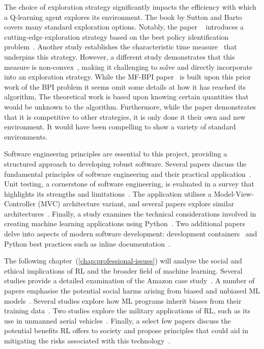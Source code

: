 \documentclass[]{final_report}
\begin{document}
The choice of exploration strategy significantly impacts the efficiency with which a Q-learning agent explores its environment. The book by Sutton and Barto~\cite{sutton2018reinforcement} covers many standard exploration options. Notably, the paper ~\cite{modelFree} introduces a cutting-edge exploration strategy based on the best policy identification problem~\cite{bestPolicyIdentifaction}. Another study establishes the characteristic time measure~\cite{characteristicTime} that underpins this strategy. However, a different study demonstrates that this measure is non-convex~\cite{characteristicTimeNonConvex}, making it challenging to solve and directly incorporate into an exploration strategy. While the MF-BPI paper~\cite{modelFree} is built upon this prior work of the BPI problem it seems omit some details at how it has reached its algorithm, The theoretical work is based upon knowing certain quantities that would be unknown to the algorithm. Furthermore, while the paper demonstrates that it is competitive to other strategies, it is only done it their own and new  environment. It would have been compelling to show a variety of standard environments.

Software engineering principles are essential to this project, providing a structured approach to developing robust software. Several papers discuss the fundamental principles of software engineering and their practical application~\cite{softwareEngineringPrinciples,van2008software}. Unit testing, a cornerstone of software engineering, is evaluated in a survey that highlights its strengths and limitations~\cite{unitTestingSurvey}. The application utilises a Model-View-Controller (MVC) architecture variant, and several papers explore similar architectures~\cite{webMVC, mvvm, gamesMVC}. Finally, a study examines the technical considerations involved in creating machine learning applications using Python~\cite{pythonMachineLearning}. Two additional papers delve into aspects of modern software development: development containers~\cite{developmentContainers} and Python best practices such as inline documentation~\cite{pythonAutoDoc}.

The following chapter~(\ref{chap:professional-issues}) will analyse the social and ethical implications of RL and the broader field of machine learning. Several studies provide a detailed examination of the Amazon  case study~\cite{facialRecognitionBias, legislatingRekognition, legislatingOG, rekognitionOverview}. A number of papers emphasise the potential social harms arising from biased and unbiased ML models~\cite{AISocialImpactAndAccountability,facialRecognitionBias, anprAccountability}. Several studies explore how ML programs inherit biases from their training data~\cite{LLMSocialEthicalRisks, AISocialImpactAndAccountability, facialRecognitionBias}. Two studies explore the military applications of RL, such as its use in unmanned aerial vehicles~\cite{rlMilitaryReviewChina, DRLDrones}. Finally, a select few papers discuss the potential benefits RL offers to society and propose principles that could aid in mitigating the risks associated with this technology~\cite{AIRisksAndPrinciples,deepRLsocietalImpact, ransbotham2017reshaping}.
\end{document}
